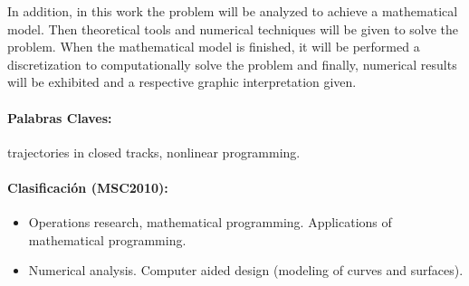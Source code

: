 \documentclass[a4paper,10pt]{book}
\begin{document}
    In addition, in this work the problem will be analyzed to achieve a mathematical model. Then theoretical tools and numerical techniques will be given to solve the problem. When the mathematical model is finished, it will be performed a discretization to computationally solve the problem and finally, numerical results will be exhibited and a respective graphic interpretation given. 

\vfill
\paragraph{Palabras Claves:} trajectories in closed tracks, nonlinear programming.
\paragraph{Clasificación (MSC2010):}
\begin{itemize}
   \item[90C90] Operations research, mathematical programming. Applications of mathematical programming.
   \item[65D17] Numerical analysis. Computer aided design (modeling of curves and surfaces).
\end{itemize}

    
    

\tableofcontents

\pagebreak
\end{document}
